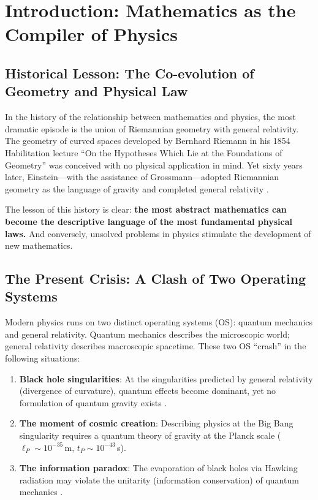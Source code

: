 \documentclass[12pt,a4paper]{article}
\theoremstyle{definition}
\begin{document}
\tableofcontents
\newpage

\section{Introduction: Mathematics as the Compiler of Physics}

\subsection{Historical Lesson: The Co-evolution of Geometry and Physical Law}

In the history of the relationship between mathematics and physics, the most dramatic episode is the union of Riemannian geometry with general relativity. The geometry of curved spaces developed by Bernhard Riemann in his 1854 Habilitation lecture ``On the Hypotheses Which Lie at the Foundations of Geometry'' \cite{Riemann1854} was conceived with no physical application in mind. Yet sixty years later, Einstein---with the assistance of Grossmann---adopted Riemannian geometry as the language of gravity and completed general relativity \cite{Einstein1915}.

The lesson of this history is clear: \textbf{the most abstract mathematics can become the descriptive language of the most fundamental physical laws.} And conversely, unsolved problems in physics stimulate the development of new mathematics.

\subsection{The Present Crisis: A Clash of Two Operating Systems}

Modern physics runs on two distinct operating systems (OS): quantum mechanics and general relativity. Quantum mechanics describes the microscopic world; general relativity describes macroscopic spacetime. These two OS ``crash'' in the following situations:

\begin{enumerate}[leftmargin=2em]
  \item \textbf{Black hole singularities}: At the singularities predicted by general relativity (divergence of curvature), quantum effects become dominant, yet no formulation of quantum gravity exists \cite{Penrose1965, Hawking1970}.
  \item \textbf{The moment of cosmic creation}: Describing physics at the Big Bang singularity requires a quantum theory of gravity at the Planck scale ($\ell_P \sim 10^{-35}$\,m, $t_P \sim 10^{-43}$\,s).
  \item \textbf{The information paradox}: The evaporation of black holes via Hawking radiation may violate the unitarity (information conservation) of quantum mechanics \cite{Hawking1976}.
\end{enumerate}
\end{document}
